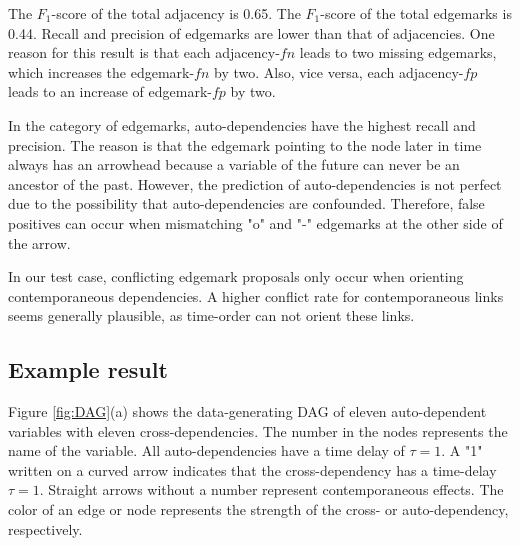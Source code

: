 \documentclass[conference]{IEEEtran}
\begin{document}
The $F_1$-score of the total adjacency is 0.65.
The $F_1$-score of the total edgemarks is 0.44.
Recall and precision of edgemarks are lower than that of adjacencies. One reason for this result is that each adjacency-$fn$ leads to two missing edgemarks, which increases the edgemark-$fn$ by two.
Also, vice versa, each adjacency-$fp$ leads to an increase of edgemark-$fp$ by two.

In the category of edgemarks, auto-dependencies have the highest recall and precision. The reason is that the edgemark pointing to the node later in time always has an arrowhead because a variable of the future can never be an ancestor of the past. However, the prediction of auto-dependencies is not perfect due to the possibility that auto-dependencies are confounded. Therefore, false positives can occur when mismatching "o" and "-" edgemarks at the other side of the arrow.

In our test case, conflicting edgemark proposals only occur when orienting contemporaneous dependencies. A higher conflict rate for contemporaneous links seems generally plausible, as time-order can not orient these links.


\subsection{Example result}
Figure \ref{fig:DAG}(a) shows the data-generating DAG of eleven auto-dependent variables with eleven cross-dependencies.
The number in the nodes represents the name of the variable.
All auto-dependencies have a time delay of $\tau=1$.
A "1" written on a curved arrow indicates that the cross-dependency has a time-delay $\tau=1$. Straight arrows without a number represent contemporaneous effects. 
The color of an edge or node represents the strength of the cross- or auto-dependency, respectively.
\end{document}
